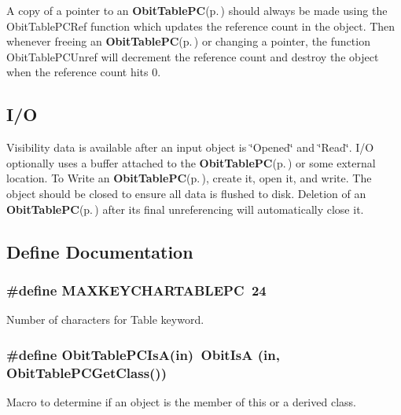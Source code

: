 A copy of a pointer to an {\bf Obit\-Table\-PC}{\rm (p.\,\pageref{structObitTablePC})} should always be made using the Obit\-Table\-PCRef function which updates the reference count in the object. Then whenever freeing an {\bf Obit\-Table\-PC}{\rm (p.\,\pageref{structObitTablePC})} or changing a pointer, the function Obit\-Table\-PCUnref will decrement the reference count and destroy the object when the reference count hits 0.\subsection{I/O}\label{ObitTablePC_8h_ObitTablePCUsage}
Visibility data is available after an input object is \char`\"{}Opened\char`\"{} and \char`\"{}Read\char`\"{}. I/O optionally uses a buffer attached to the {\bf Obit\-Table\-PC}{\rm (p.\,\pageref{structObitTablePC})} or some external location. To Write an {\bf Obit\-Table\-PC}{\rm (p.\,\pageref{structObitTablePC})}, create it, open it, and write. The object should be closed to ensure all data is flushed to disk. Deletion of an {\bf Obit\-Table\-PC}{\rm (p.\,\pageref{structObitTablePC})} after its final unreferencing will automatically close it.

\subsection{Define Documentation}
\subsubsection{\setlength{\rightskip}{0pt plus 5cm}\#define MAXKEYCHARTABLEPC\ 24}\label{ObitTablePC_8h_a0}


Number of characters for Table keyword. 

\subsubsection{\setlength{\rightskip}{0pt plus 5cm}\#define Obit\-Table\-PCIs\-A(in)\ Obit\-Is\-A (in, Obit\-Table\-PCGet\-Class())}\label{ObitTablePC_8h_a3}


Macro to determine if an object is the member of this or a derived class. 

